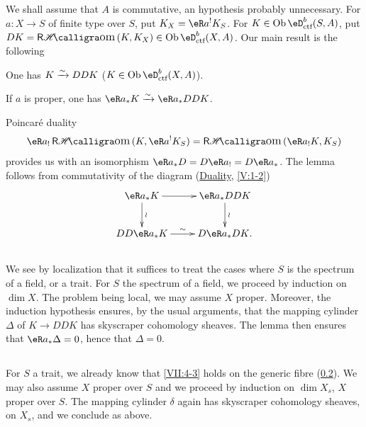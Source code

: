 \subsection{}\label{VII:4-2}

We shall assume that $A$ is commutative, an hypothesis probably unnecessary. For
$a:X\to S$ of finite type over $S$, put $K_X=\eR a^! K_S$. For
$K\in\ob\eD_\text{ctf}^b(S,A)$, put
$D K=\rHom(K,K_X)\in\ob\eD_\text{ctf}^b(X,A)$. Our main result is
the following




\begin{theorem_}\label{VII:4-3}
One has $K\xrightarrow\sim D D K$ ($K\in \ob\eD_\textnormal{ctf}^b(X,A)$).
\end{theorem_}




\begin{lemma_}\label{VII:4-4}
If $a$ is proper, one has $\eR a_\ast K \iso \eR a_\ast D D K$.
\end{lemma_}

Poincar\'e duality
\[
  \eR a_! \rHom(K,\eR a^! K_S) = \rHom(\eR a_! K,K_S)
\]
provides us with an isomorphism $\eR a_\ast D = D \eR a_! = D \eR a_\ast$. The
lemma follows from commutativity of the diagram (\hyperref[V]{Duality},
\ref{V:1-2})
\[\xymatrix{
  \eR a_\ast K \ar[r] \ar[d]^-\wr
    & \eR a_\ast D D K \ar[d]^-\wr \\
  D D \eR a_\ast K \ar[r]^-\sim
    & D \eR a_\ast D K \text{.}
}\]




\subsection{}\label{VII:4-5}

We see by localization that it suffices to treat the cases where $S$ is the spectrum
of a field, or a trait. For $S$ the spectrum of a field, we proceed by
induction on $\dim X$. The problem being local, we may assume $X$
proper. Moreover, the induction hypothesis ensures, by the usual
arguments, that the mapping cylinder $\Delta$ of $K\to D D K$ has
skyscraper cohomology sheaves. The lemma then ensures that $\eR a_\ast \Delta=0$,
hence that $\Delta=0$.




\subsection{}\label{VII:4-6}

For $S$ a trait, we already know that \ref{VII:4-3} holds on the generic
fibre (\ref{VII:4-5}). We may also assume $X$ proper over $S$ and we
proceed by induction on $\dim{X_s}$, $X$ proper over $S$. The mapping
cylinder $\delta$ again has skyscraper cohomology sheaves, on
$X_s$, and we conclude as above.




